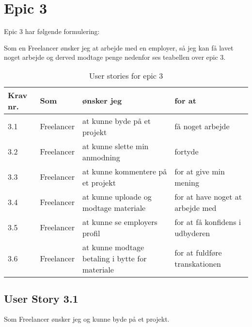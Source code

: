 \section{Epic 3}
Epic 3 har følgende formulering:

Som en Freelancer ønsker jeg at arbejde med en employer, så jeg kan få lavet noget arbejde og derved modtage penge
nedenfor ses teabellen over epic 3.

\begin{table}[H]
    \centering
    \caption{User stories for epic 3}
    \label{tab:us-epic3}
    \begin{tabular}{p{1cm}|p{2cm}|p{6cm}|p{6cm}}
        \textbf{Krav nr.} & \textbf{Som} & \textbf{ønsker jeg}                             & \textbf{for at}                  \\
        \hline
        3.1               & Freelancer   & at kunne byde på et projekt                     & få noget arbejde                 \\
        \hline
        3.2               & Freelancer   & at kunne slette min anmodning                   & fortyde                          \\
        \hline
        3.3               & Freelancer   & at kunne kommentere på et projekt               & for at give min mening           \\
        \hline
        3.4               & Freelancer   & at kunne uploade og modtage materiale           & for at have noget at arbejde med \\
        \hline
        3.5               & Freelancer   & at kunne se employers profil                    & for at få konfidens i udbyderen  \\
        \hline
        3.6               & Freelancer   & at kunne modtage betaling i bytte for materiale & for at fuldføre transkationen    \\
    \end{tabular}
\end{table}

\subsection{User Story 3.1}
Som Freelancer ønsker jeg og kunne byde på et projekt.

